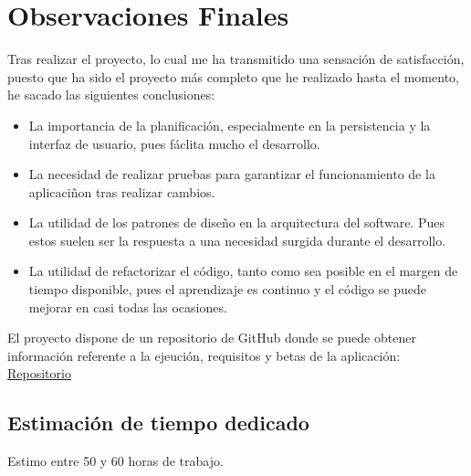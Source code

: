 \section*{Observaciones Finales}

Tras realizar el proyecto, lo cual me ha transmitido una sensación de satisfacción, puesto que ha sido el
proyecto más completo que he realizado hasta el momento, he sacado las siguientes conclusiones:
\begin{itemize}
    \item La importancia de la planificación, especialmente en la persistencia y la interfaz de usuario, pues fáclita mucho el desarrollo.
    \item La necesidad de realizar pruebas para garantizar el funcionamiento de la aplicaciñon tras realizar cambios.
    \item La utilidad de los patrones de diseño en la arquitectura del software. Pues estos suelen ser la respuesta a una necesidad surgida durante el desarrollo.
    \item La utilidad de refactorizar el código, tanto como sea posible en el margen de tiempo disponible,  pues el aprendizaje es continuo y el código se puede mejorar en casi todas las ocasiones.
\end{itemize}

El proyecto dispone de un repositorio de GitHub donde se puede obtener información referente a la ejeución, requisitos y betas de la aplicación: 
\textcolor{blue}{\href{https://github.com/StoneySpring688/AppChat_2024-2025}{Repositorio}}


\subsection*{Estimación de tiempo dedicado}

Estimo entre 50 y 60 horas de trabajo.
